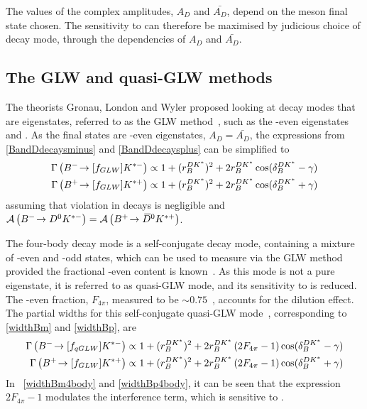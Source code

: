 The values of the complex amplitudes, $A_{D}$ and $\bar{A_{D}}$, depend on the \D meson final state chosen. The sensitivity to \Pgamma can therefore be maximised by judicious choice of \Dz decay mode, through the dependencies of $A_{D}$ and $\bar{A_{D}}$.

\subsection{The GLW and quasi-GLW methods}
\label{sec:theory:glw}

The theorists Gronau, London and Wyler proposed looking at \D decay modes that are \CP eigenstates, referred to as the GLW method~\cite{GL,GW}, such as the \CP-even eigenstates \decay{\Dz}{\Kp\Km} and \decay{\Dz}{\pip\pim}. As the final states are \CP-even eigenstates, $A_{D} = \bar{A_{D}}$, the expressions from \eqn\ref{BandDdecaysminus} and \ref{BandDdecaysplus} can be simplified to
\begin{align}
\Gamma\left({{{B}^-}}\!\rightarrow [f_{GLW}]{\ensuremath{{K}^{*-}}}\right) &\propto 1 + (r_B^{DK^*})^2 + 2r_B^{DK^*}\cos(\delta_B^{DK^*} - \gamma) \label{widthBm} \\
\Gamma\left({{{B}^+}}\!\rightarrow [f_{GLW}]{\ensuremath{{K}^{*+}}}\right) &\propto 1 + (r_B^{DK^*})^2 + 2r_B^{DK^*}\cos(\delta_B^{DK^*} + \gamma) \label{widthBp}
\end{align}
assuming that \CP violation in \D decays is negligible and $\mathcal{A}\left({{{B}^-}}\!\rightarrow {\ensuremath{{D}^0}}{\ensuremath{{K}^{*-}}}\right) = \mathcal{A}\left({{{B}^+}}\!\rightarrow {\ensuremath{{\kern 0.2em\overline{\kern -0.2em D}{}}{}^0}}{\ensuremath{{K}^{*+}}}\right)$. 

The four-body \D decay mode \decay{\D}{\pip\pim\pip\pim} is a self-conjugate decay mode, containing a mixture of \CP-even and \CP-odd states, which can be used to measure \Pgamma via the GLW method provided the fractional \CP-even content is known~\cite{NAYAK20151}. As this mode is not a pure \CP eigenstate, it is referred to as quasi-GLW mode, and its sensitivity to \Pgamma is reduced. The \CP-even fraction, $F_{4\pi}$, measured to be $\sim 0.75$~\cite{charm4pi}, accounts for the dilution effect. The partial widths for this self-conjugate quasi-GLW mode~\cite{NAYAK20151,charm4pi}, corresponding to \eqn\ref{widthBm} and \ref{widthBp}, are
\begin{align}
\Gamma\left({{{B}^-}}\!\rightarrow [f_{qGLW}]{\ensuremath{{K}^{*-}}}\right) \propto 1 + (r_B^{DK^*})^2 + 2r_B^{DK^*}\left(2F_{4\pi} - 1\right)\cos(\delta_B^{DK^*} - \gamma) \label{widthBm4body} \\
\Gamma\left({{{B}^+}}\!\rightarrow [f_{GLW}]{\ensuremath{{K}^{*+}}}\right) \propto 1 + (r_B^{DK^*})^2 + 2r_B^{DK^*}\left(2F_{4\pi} - 1\right)\cos(\delta_B^{DK^*} + \gamma) \label{widthBp4body}
\end{align}
In \eqn~\ref{widthBm4body} and \ref{widthBp4body}, it can be seen that the expression $2F_{4\pi} - 1$ modulates the interference term, which is sensitive to \Pgamma.


